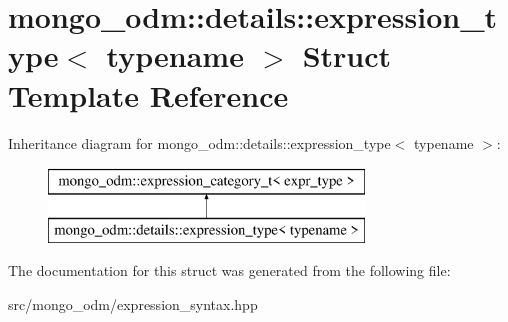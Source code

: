 \hypertarget{structmongo__odm_1_1details_1_1expression__type}{}\section{mongo\+\_\+odm\+:\+:details\+:\+:expression\+\_\+type$<$ typename $>$ Struct Template Reference}
\label{structmongo__odm_1_1details_1_1expression__type}
Inheritance diagram for mongo\+\_\+odm\+:\+:details\+:\+:expression\+\_\+type$<$ typename $>$\+:\begin{figure}[H]
\begin{center}
\leavevmode
\includegraphics[height=2.000000cm]{structmongo__odm_1_1details_1_1expression__type}
\end{center}
\end{figure}


The documentation for this struct was generated from the following file\+:\begin{DoxyCompactItemize}
\item 
src/mongo\+\_\+odm/expression\+\_\+syntax.\+hpp\end{DoxyCompactItemize}

